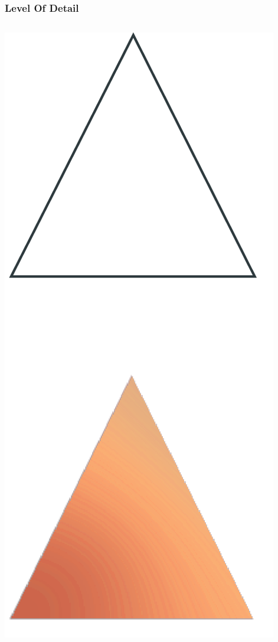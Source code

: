 \begin{frame}
	\frametitle{Level Of Detail}
	\begin{columns}
		\begin{column}[b]{0.22\textwidth}
			\begin{center}
				\includegraphics[width=\textwidth]{./img/1_single/lod_lod0.png}

\end{center}
\end{column}
\end{columns}
\end{frame}
